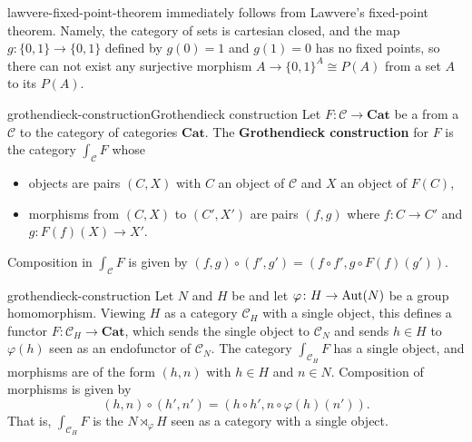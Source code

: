 \begin{example}{lawvere-fixed-point-theorem}
     immediately follows from Lawvere's fixed-point theorem. Namely, the category of sets is cartesian closed, and the map $g \colon \{ 0, 1 \} \to \{ 0, 1 \}$ defined by $g(0) = 1$ and $g(1) = 0$ has no fixed points, so there can not exist any surjective morphism $A \to \{ 0, 1 \}^A \cong P(A)$ from a set $A$ to its  $P(A)$.
\end{example}

\begin{topic}{grothendieck-construction}{Grothendieck construction}
    Let $F \colon \mathcal{C} \to \textbf{Cat}$ be a  from a  $\mathcal{C}$ to the category of  categories $\textbf{Cat}$. The \textbf{Grothendieck construction} for $F$ is the category $\int_\mathcal{C} F$ whose
    \begin{itemize}
        \item objects are pairs $(C, X)$ with $C$ an object of $\mathcal{C}$ and $X$ an object of $F(C)$,
        \item morphisms from $(C, X)$ to $(C', X')$ are pairs $(f, g)$ where $f \colon C \to C'$ and $g \colon F(f)(X) \to X'$.
    \end{itemize}
    Composition in $\int_\mathcal{C} F$ is given by $(f, g) \circ (f', g') = (f \circ f', g \circ F(f)(g'))$.
\end{topic}

\begin{example}{grothendieck-construction}
    Let $N$ and $H$ be  and let $\varphi \colon H \to \textup{Aut}(N)$ be a group homomorphism. Viewing $H$ as a category $\mathcal{C}_H$ with a single object, this defines a functor $F \colon \mathcal{C}_H \to \textbf{Cat}$, which sends the single object to $\mathcal{C}_N$ and sends $h \in H$ to $\varphi(h)$ seen as an endofunctor of $\mathcal{C}_N$. The category $\int_{\mathcal{C}_H} F$ has a single object, and morphisms are of the form $(h, n)$ with $h \in H$ and $n \in N$. Composition of morphisms is given by
    \[ (h, n) \circ (h', n') = (h \circ h', n \circ \varphi(h)(n')) . \]
    That is, $\int_{\mathcal{C}_H} F$ is the  $N \rtimes_\varphi H$ seen as a category with a single object.
\end{example}

